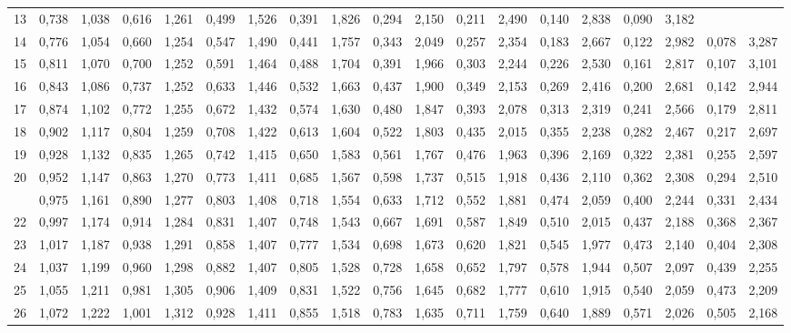 \documentclass[12pt,a4paper]{article}
\begin{document}
{\begin{longtable}{@{\extracolsep{\fill}}rcccccccccccccccccc@{}}
13 & 0,738 & 1,038 & 0,616 & 1,261 & 0,499 & 1,526 & 0,391 & 1,826 & 0,294 & 2,150 & 0,211 & 2,490 & 0,140 & 2,838 & 0,090 & 3,182 &  &  \\
14 & 0,776 & 1,054 & 0,660 & 1,254 & 0,547 & 1,490 & 0,441 & 1,757 & 0,343 & 2,049 & 0,257 & 2,354 & 0,183 & 2,667 & 0,122 & 2,982 & 0,078 & 3,287 \\
15 & 0,811 & 1,070 & 0,700 & 1,252 & 0,591 & 1,464 & 0,488 & 1,704 & 0,391 & 1,966 & 0,303 & 2,244 & 0,226 & 2,530 & 0,161 & 2,817 & 0,107 & 3,101 \\
16 & 0,843 & 1,086 & 0,737 & 1,252 & 0,633 & 1,446 & 0,532 & 1,663 & 0,437 & 1,900 & 0,349 & 2,153 & 0,269 & 2,416 & 0,200 & 2,681 & 0,142 & 2,944 \\
17 & 0,874 & 1,102 & 0,772 & 1,255 & 0,672 & 1,432 & 0,574 & 1,630 & 0,480 & 1,847 & 0,393 & 2,078 & 0,313 & 2,319 & 0,241 & 2,566 & 0,179 & 2,811 \\
18 & 0,902 & 1,117 & 0,804 & 1,259 & 0,708 & 1,422 & 0,613 & 1,604 & 0,522 & 1,803 & 0,435 & 2,015 & 0,355 & 2,238 & 0,282 & 2,467 & 0,217 & 2,697 \\
19 & 0,928 & 1,132 & 0,835 & 1,265 & 0,742 & 1,415 & 0,650 & 1,583 & 0,561 & 1,767 & 0,476 & 1,963 & 0,396 & 2,169 & 0,322 & 2,381 & 0,255 & 2,597 \\
20 & 0,952 & 1,147 & 0,863 & 1,270 & 0,773 & 1,411 & 0,685 & 1,567 & 0,598 & 1,737 & 0,515 & 1,918 & 0,436 & 2,110 & 0,362 & 2,308 & 0,294 & 2,510 \\
\addlinespace[2pt]
21 & 0,975 & 1,161 & 0,890 & 1,277 & 0,803 & 1,408 & 0,718 & 1,554 & 0,633 & 1,712 & 0,552 & 1,881 & 0,474 & 2,059 & 0,400 & 2,244 & 0,331 & 2,434 \\
22 & 0,997 & 1,174 & 0,914 & 1,284 & 0,831 & 1,407 & 0,748 & 1,543 & 0,667 & 1,691 & 0,587 & 1,849 & 0,510 & 2,015 & 0,437 & 2,188 & 0,368 & 2,367 \\
23 & 1,017 & 1,187 & 0,938 & 1,291 & 0,858 & 1,407 & 0,777 & 1,534 & 0,698 & 1,673 & 0,620 & 1,821 & 0,545 & 1,977 & 0,473 & 2,140 & 0,404 & 2,308 \\
24 & 1,037 & 1,199 & 0,960 & 1,298 & 0,882 & 1,407 & 0,805 & 1,528 & 0,728 & 1,658 & 0,652 & 1,797 & 0,578 & 1,944 & 0,507 & 2,097 & 0,439 & 2,255 \\
25 & 1,055 & 1,211 & 0,981 & 1,305 & 0,906 & 1,409 & 0,831 & 1,522 & 0,756 & 1,645 & 0,682 & 1,777 & 0,610 & 1,915 & 0,540 & 2,059 & 0,473 & 2,209 \\
26 & 1,072 & 1,222 & 1,001 & 1,312 & 0,928 & 1,411 & 0,855 & 1,518 & 0,783 & 1,635 & 0,711 & 1,759 & 0,640 & 1,889 & 0,571 & 2,026 & 0,505 & 2,168 \\

\end{longtable}}
\end{document}
